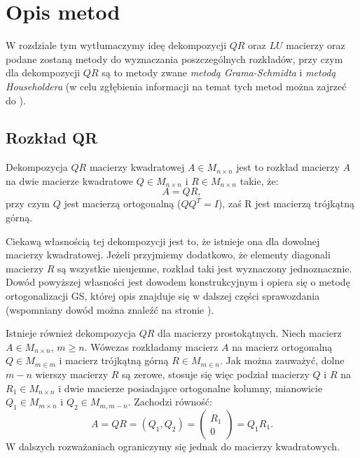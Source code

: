 \section{Opis metod}
W rozdziale tym wytłumaczymy ideę dekompozycji $QR$ oraz $LU$ macierzy oraz
podane zostaną metody do wyznaczania poszczególnych rozkładów, przy czym dla
dekompozycji $QR$ są to metody zwane \textit{metodą Grama-Schmidta} i
\textit{metodą Householdera} (w celu zgłębienia informacji na temat tych metod można zajrzeć do \cite{NAL}).
\subsection{Rozkład QR}
Dekompozycja $QR$ macierzy kwadratowej $A \in M_{n \times n}$ jest to rozkład
macierzy $A$ na dwie macierze kwadratowe $Q \in M_{n \times n}$ i $R \in M_{n
\times n}$ takie, że:
$$A=QR,$$
przy czym $Q$ jest macierzą ortogonalną ($QQ^T=I$), zaś R jest macierzą trójkątną
górną.

Ciekawą własnością tej dekompozycji jest to, że istnieje ona dla dowolnej
macierzy kwadratowej. Jeżeli przyjmiemy dodatkowo, że elementy diagonali
macierzy $R$ są wszystkie nieujemne, rozkład taki jest wyznaczony jednoznacznie.
Dowód powyższej własności jest dowodem konstrukcyjnym
i opiera się o metodę ortogonalizacji GS, której opis znajduje się w
dalszej części sprawozdania (wspomniany dowód można znaleźć na stronie \cite{Dow}).

Istnieje również dekompozycja $QR$ dla macierzy prostokątnych. Niech macierz
$A \in M_{n \times n}$, $m \geq n$. Wówczas rozkładamy macierz $A$ na macierz
ortogonalną $Q \in M_{m \in m}$ i macierz trójkątną górną $R \in M_{m \in n}$.
Jak można zauważyć, dolne $m-n$ wierszy macierzy $R$ są zerowe, stosuje się więc
podział macierzy $Q$ i $R$ na $R_1 \in M_{n \times n}$ i dwie macierze posiadające
ortogonalne kolumny, mianowicie $Q_1 \in M_{m \times n}$ i $Q_2 \in M_{m, m-n}$.
Zachodzi równość:
$$A=QR=(Q_1, Q_2)=\begin{pmatrix} R_1 \\ 0 \end{pmatrix}=Q_1R_1.$$
W dalszych rozważaniach ograniczymy się jednak do macierzy kwadratowych.

